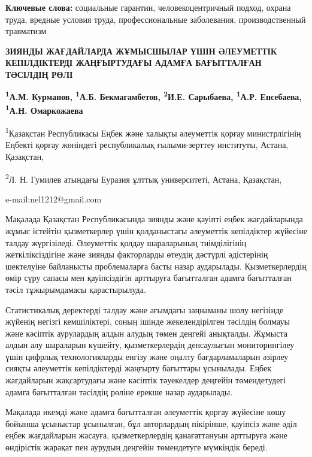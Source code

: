 {\bfseries Ключевые слова:} социальные гарантии, человекоцентричный подход,
охрана труда, вредные условия труда, профессиональные заболевания,
производственный травматизм
\begin{articleheader}

{\bfseries ЗИЯНДЫ ЖАҒДАЙЛАРДА ЖҰМЫСШЫЛАР ҮШІН ӘЛЕУМЕТТІК КЕПІЛДІКТЕРДІ
ЖАҢҒЫРТУДАҒЫ АДАМҒА БАҒЫТТАЛҒАН ТӘСІЛДІҢ РӨЛІ}

{\bfseries \textsuperscript{1}А.М. Курманов, \textsuperscript{1}А.Б.
Бекмагамбетов, \textsuperscript{2}И.Е. Сарыбаева,
\textsuperscript{1}А.Р. Енсебаева\textsuperscript{\envelope },}
{\bfseries \textsuperscript{1}А.Н. Омаркожаева}
\end{articleheader}
\begin{affiliation}

\textsuperscript{1}Қазақстан Республикасы Еңбек және халықты әлеуметтік
қорғау министрлігінің Еңбекті қорғау жөніндегі республикалық
ғылыми-зерттеу институты, Астана, Қазақстан,

\textsuperscript{2}Л. Н. Гумилев атындағы Еуразия ұлттық университеті, Астана, Қазақстан,

e-mail:nel1212@gmail.com
\end{affiliation}

Мақалада Қазақстан Республикасында зиянды және қауіпті еңбек
жағдайларында жұмыс істейтін қызметкерлер үшін қолданыстағы әлеуметтік
кепілдіктер жүйесіне талдау жүргізіледі. Әлеуметтік қолдау шараларының
тиімділігінің жеткіліксіздігіне және зиянды факторларды өтеудің дәстүрлі
әдістерінің шектелуіне байланысты проблемаларға басты назар аударылады.
Қызметкерлердің өмір сүру сапасы мен қауіпсіздігін арттыруға бағытталған
адамға бағытталған тәсіл тұжырымдамасы қарастырылуда.

Статистикалық деректерді талдау және ағымдағы заңнаманы шолу негізінде
жүйенің негізгі кемшіліктері, соның ішінде жекелендірілген тәсілдің
болмауы және кәсіптік аурулардың алдын алудың төмен деңгейі анықталды.
Жұмыста алдын алу шараларын күшейту, қызметкерлердің денсаулығын
мониторингілеу үшін цифрлық технологияларды енгізу және оңалту
бағдарламаларын әзірлеу сияқты әлеуметтік кепілдіктерді жаңғырту
бағыттары ұсынылады. Еңбек жағдайларын жақсартудағы және кәсіптік
тәуекелдер деңгейін төмендетудегі адамға бағытталған тәсілдің рөліне
ерекше назар аударылады.

Мақалада икемді және адамға бағытталған әлеуметтік қорғау жүйесіне көшу
бойынша ұсыныстар ұсынылған, бұл авторлардың пікірінше, қауіпсіз және
әділ еңбек жағдайларын жасауға, қызметкерлердің қанағаттануын арттыруға
және өндірістік жарақат пен аурудың деңгейін төмендетуге мүмкіндік
береді.

